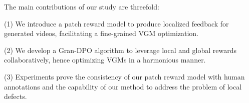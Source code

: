 The main contributions of our study are threefold:

(1) We introduce a patch reward model to produce localized feedback for generated videos, facilitating a fine-grained VGM optimization.

(2) We develop a Gran-DPO algorithm to leverage local and global rewards collaboratively, hence optimizing VGMs in a harmonious manner.

(3) Experiments prove the consistency of our patch reward model with human annotations and the capability of our method to address the problem of local defects.